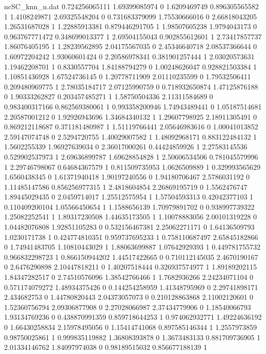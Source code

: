 \begin{filecontents}{ncSC_knn_n.dat}
0.724256065111 1.69399085974 0
1.6209469749 0.896305565582 1
1.4108249871 2.69325548204 0
0.731683379099 1.75530666016 0
2.66818043205 1.26531687028 1
1.22885913381 0.879446291705 1
1.98507605238 1.9794043173 0
0.963767771472 0.348699013377 1
2.69504155043 0.902855612601 1
2.73417857737 1.86076405195 1
1.28239562895 2.04175567035 0
2.45346640718 2.08537366644 0
1.60972204242 1.93060601424 0
2.20586978341 0.381901257444 1
2.03020573631 1.19462208701 1
0.8330557704 1.84188794279 0
1.00248626047 0.928821503384 1
1.10851436928 1.67524736145 0
1.20778711909 2.01110235599 0
1.79532506411 0.209480969775 1
2.78035184717 2.07125990759 0
0.718932650874 1.47125876188 0
1.90333262827 0.203457485271 1
1.58750504336 2.11311584689 0
0.983400317166 0.862569380061 1
0.993358200946 1.74943489441 0
1.05187514681 2.20587001212 0
1.92926943696 1.34684340132 1
1.29607798925 2.18911305491 0
0.869212118687 0.371181480987 1
1.51119766441 2.05646983616 0
1.00041013852 2.59147074748 0
2.5294720755 1.40029007582 1
1.48092968171 0.883122484132 1
1.5602255339 1.96927639034 0
2.36017000261 0.44424859926 1
2.27583145536 0.529902537973 1
2.69636899787 1.69628854828 1
2.50606534506 0.781045579996 1
2.29746798067 0.64684367579 1
0.811509735953 1.0626509889 1
0.329993565629 1.6560438345 0
1.61371940418 1.90197240556 0
1.94180706467 2.5786031192 0
1.11485147586 0.856256977315 1
2.4818604854 2.26869195719 0
1.5562476747 1.89445029435 0
2.0459714017 1.25512575954 1
1.57504593313 0.42042377103 1
0.110409200104 1.05566450654 1
1.1588656139 1.70979891702 0
0.938997739322 1.25082252541 1
1.89317230508 1.44635173505 1
1.10078883056 2.00101319228 0
1.04482076808 1.92851105283 0
0.532156467381 2.25062271171 0
1.64136509793 1.0230171738 1
0.424774810351 0.959737695233 1
0.758110687497 2.65845182866 0
1.74941483705 1.10810443029 1
1.88063699887 1.07642929393 1
0.449781755732 0.966832298723 1
0.866150944202 1.44517422665 0
0.710112145035 2.4670190167 0
2.6476290898 2.10447818211 0
1.40207518444 0.326937574977 1
1.89189202115 1.84347282517 0
2.74510576096 1.38542766466 1
1.7682936266 2.24234071104 0
0.571174079272 1.48934375426 0
0.144254258959 1.41348795969 0
2.29741898171 2.434682753 0
1.44780820443 2.04373057073 0
0.210128863868 2.11002120601 0
1.52360756794 2.09306877908 0
2.27028066987 2.37434779906 0
1.18540066793 1.93134769236 0
0.438870991359 0.859718644253 1
0.974062932771 1.49224636192 0
1.66430258834 2.15978495056 0
1.15414741068 0.897585146344 1
1.2557973859 0.98750025861 1
0.999835119882 1.36808393878 0
1.3673483133 0.881709736905 1
2.01334146762 1.84097974038 0
0.98189515032 0.856677188139 1

\end{filecontents}
